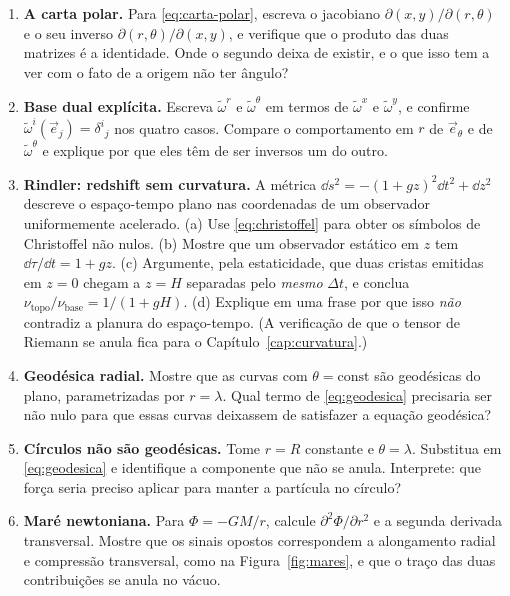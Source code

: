 \documentclass[12pt,a4paper,oneside]{book}
\theoremstyle{rgplain}
\theoremstyle{rgremark}
\begin{document}
\begin{enumerate}
  \item \textbf{A carta polar.} Para \eqref{eq:carta-polar}, escreva o
  jacobiano $\partial(x,y)/\partial(r,\theta)$ e o seu inverso
  $\partial(r,\theta)/\partial(x,y)$, e verifique que o produto das duas
  matrizes é a identidade. Onde o segundo deixa de existir, e o que isso tem a ver com o fato
  de a origem não ter ângulo?

  \item \textbf{Base dual explícita.} Escreva $\tilde\omega^r$ e
  $\tilde\omega^\theta$ em termos de $\tilde\omega^x$ e $\tilde\omega^y$, e
  confirme $\tilde\omega^i(\vec e_j)=\delta^i{}_j$ nos quatro casos. Compare o
  comportamento em $r$ de $\vec e_\theta$ e de $\tilde\omega^\theta$ e explique
  por que eles têm de ser inversos um do outro.

  \item\label{prob:rindler} \textbf{Rindler: redshift sem curvatura.}
  A métrica $\dd s^2=-(1+gz)^2\dd t^2+\dd z^2$ descreve o espaço-tempo plano
  nas coordenadas de um observador uniformemente acelerado. (a) Use
  \eqref{eq:christoffel} para obter os símbolos de Christoffel não nulos.
  (b) Mostre que um observador estático em $z$ tem $\dd\tau/\dd t=1+gz$.
  (c) Argumente, pela estaticidade, que duas cristas emitidas em $z=0$ chegam
  a $z=H$ separadas pelo \emph{mesmo} $\Delta t$, e conclua
  $\nu_{\text{topo}}/\nu_{\text{base}}=1/(1+gH)$. (d) Explique em uma frase por
  que isso \emph{não} contradiz a planura do espaço-tempo. (A verificação de
  que o tensor de Riemann se anula fica para o
  Capítulo~\ref{cap:curvatura}.)

  \item \textbf{Geodésica radial.} Mostre que as curvas com
  $\theta=\mathrm{const}$ são geodésicas do plano, parametrizadas por
  $r=\lambda$. Qual termo de \eqref{eq:geodesica} precisaria ser não nulo para que essas
  curvas deixassem de satisfazer a equação geodésica?

  \item \textbf{Círculos não são geodésicas.} Tome $r=R$ constante e
  $\theta=\lambda$. Substitua em \eqref{eq:geodesica} e identifique a
  componente que não se anula. Interprete: que força seria preciso aplicar
  para manter a partícula no círculo?

  \item \textbf{Maré newtoniana.} Para $\Phi=-GM/r$, calcule
  $\partial^2\Phi/\partial r^2$ e a segunda derivada transversal. Mostre que
  os sinais opostos correspondem a alongamento radial e compressão
  transversal, como na Figura~\ref{fig:mares}, e que o traço das duas
  contribuições se anula no vácuo.
\end{enumerate}
\end{document}
